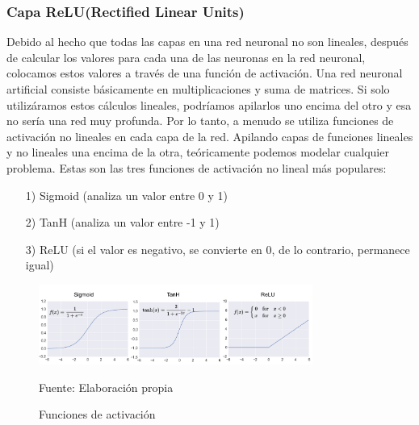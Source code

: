 	\subsubsection  {Capa ReLU(Rectified Linear Units)}
		\vskip -0.2cm 
		Debido al hecho que todas las capas en una red neuronal no son lineales, después de calcular los valores para cada una de las neuronas en la red neuronal, colocamos estos valores a través de una función de activación. Una red neuronal artificial consiste básicamente en multiplicaciones y suma de matrices. Si solo utilizáramos estos cálculos lineales, podríamos apilarlos uno encima del otro y esa no sería una red muy profunda. Por lo tanto, a menudo se utiliza funciones de activación no lineales en cada capa de la red. Apilando capas de funciones lineales y no lineales una encima de la otra, teóricamente podemos modelar cualquier problema.
		\vskip 0.2cm 
		Estas son las tres funciones de activación no lineal más populares:
		\begin{enumerate}
		\item[1)] Sigmoid (analiza un valor entre 0 y 1)  \vspace{-0.5em}
		\item[2)] TanH (analiza un valor entre -1 y 1) \vspace{-0.5em}
		\item[3)] ReLU (si el valor es negativo, se convierte en 0, de lo contrario, permanece igual) \vspace{-0.5em}
		\end{enumerate}

		\begin{figure}[H]
		\begin{center}
		\includegraphics[width=0.8\textwidth]{images/marcoteorico/activfunct}
		\end{center}
		\begin{center}
		\caption{\small{Funciones de activación}}
		\vskip -0.2cm  
		{\small{Fuente: Elaboración propia}}
		\end{center}
		\vspace{-1.5em}
		\end{figure}

